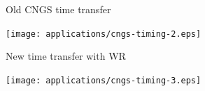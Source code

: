 \documentclass[compress,red]{beamer}
\begin{document}
\begin{frame}{Old CNGS time transfer}

      \begin{center}
      \texttt{[image: applications/cngs-timing-2.eps]}
      \end{center}

\end{frame}
\begin{frame}{New time transfer with WR}

      \begin{center}
      \texttt{[image: applications/cngs-timing-3.eps]}
      \end{center}

\end{frame}
\end{document}
